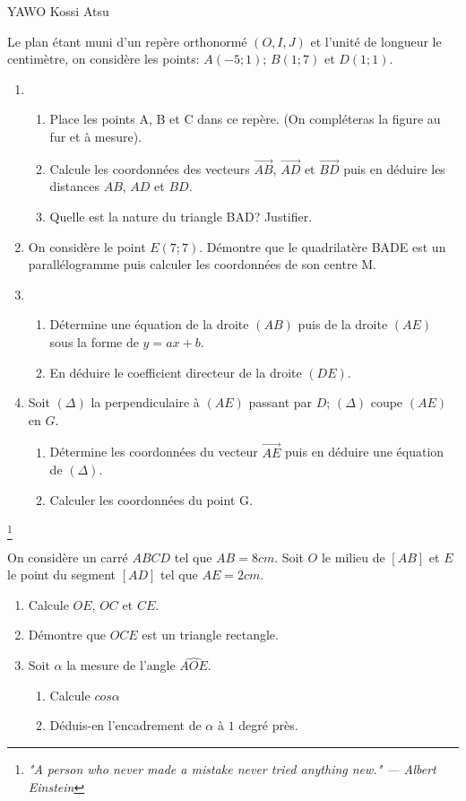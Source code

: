 \documentclass[12pt,a4paper]{book}
\newcommand{\prof}{YAWO Kossi Atsu}
\begin{document}
\begin{revision}{\prof}
\vspace{0.3cm}

\begin{exo}
Le plan étant muni d'un repère orthonormé $(O,I,J)$ et l'unité de longueur le centimètre, on considère les points: $A(-5;1)$; $B(1;7)$ et $D(1;1)$.
\begin{enumerate}
\item \begin{enumerate}
\item Place les points A, B et C dans ce repère. (On compléteras la figure au fur et à mesure).
\item Calcule les coordonnées des vecteurs $\overrightarrow{AB}$, $\overrightarrow{AD}$ et $\overrightarrow{BD}$ puis en déduire les distances $AB$, $AD$ et $BD$.
\item Quelle est la nature du triangle BAD? Justifier.
\end{enumerate}
\item On considère le point $E(7;7)$. Démontre que le quadrilatère BADE est un parallélogramme puis calculer les coordonnées de son centre M.
\item \begin{enumerate}
\item Détermine une équation de la droite $(AB)$ puis de la droite $(AE)$ sous la forme de $y=ax+b$.
\item En déduire le coefficient directeur de la droite $(DE)$.
\end{enumerate}
\item Soit $(\Delta)$ la perpendiculaire à $(AE)$ passant par $D$; $(\Delta)$ coupe  $(AE)$ en $G$.
\begin{enumerate}
\item Détermine les coordonnées du vecteur $\overrightarrow{AE}$ puis en déduire une équation de $(\Delta)$.
\item Calculer les coordonnées du point G.
\end{enumerate}
\end{enumerate}
\end{exo}
\footnote{\textit{"A person who never made a mistake never tried anything new." — Albert Einstein}}

\vspace{0.3cm}

\begin{exo}
On considère un carré $ABCD$ tel que $AB=8cm$. Soit $O$ le milieu de $[AB]$ et $E$ le point du segment $[AD]$ tel que $AE=2cm$.
\begin{enumerate}
\item Calcule $OE$, $OC$ et $CE$.
\item Démontre que $OCE$ est un triangle rectangle.
\item Soit $\alpha$ la mesure de l'angle $\widehat{AOE}$.
\begin{enumerate}
\item Calcule $cos\alpha$
\item Déduis-en l'encadrement de $\alpha$ à $1$ degré près.
\end{enumerate}
\end{enumerate}
\end{exo}


\end{revision}
\end{document}
